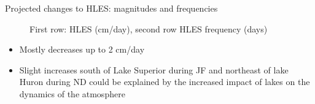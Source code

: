 \documentclass{beamer}
\begin{document}
  \begin{frame}{Projected changes to HLES: magnitudes and frequencies}
    \vspace{-1em}
    \begin{figure}
      \caption{First row: HLES (cm/day), second row HLES frequency (days)}
    \end{figure}
    \vspace{-0.5em}
    \begin{itemize}
      \item Mostly decreases up to 2 cm/day
      \item Slight increases south of Lake Superior during JF and northeast of lake Huron during ND could be explained by the increased impact of lakes on the dynamics of the atmosphere
    \end{itemize}
  \end{frame}
\end{document}
